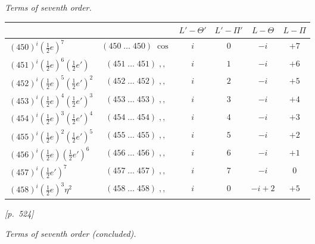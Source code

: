 \documentclass[11pt]{article}
\begin{document}
\medskip

\begin{center}
\textit{Terms of seventh order.}
\end{center}

\smallskip

\begin{center}
\begin{tabular}{|l|c|c|c|c|c|}
\hline
 & & $L'-\Theta'$ & $L'-\Pi'$ & $L-\Theta$ & $L-\Pi$ \\
\hline
$(450)^i(\tfrac{1}{2}e)^7$ & $(450\;\ldots\;450)\;\cos$ & $i$ & $0$ & $-i$ & $+7$ \\
$(451)^i(\tfrac{1}{2}e)^6(\tfrac{1}{2}e')$ & $(451\;\ldots\;451)\;,,$ & $i$ & $1$ & $-i$ & $+6$ \\
$(452)^i(\tfrac{1}{2}e)^5(\tfrac{1}{2}e')^2$ & $(452\;\ldots\;452)\;,,$ & $i$ & $2$ & $-i$ & $+5$ \\
$(453)^i(\tfrac{1}{2}e)^4(\tfrac{1}{2}e')^3$ & $(453\;\ldots\;453)\;,,$ & $i$ & $3$ & $-i$ & $+4$ \\
$(454)^i(\tfrac{1}{2}e)^3(\tfrac{1}{2}e')^4$ & $(454\;\ldots\;454)\;,,$ & $i$ & $4$ & $-i$ & $+3$ \\
$(455)^i(\tfrac{1}{2}e)^2(\tfrac{1}{2}e')^5$ & $(455\;\ldots\;455)\;,,$ & $i$ & $5$ & $-i$ & $+2$ \\
$(456)^i(\tfrac{1}{2}e)(\tfrac{1}{2}e')^6$ & $(456\;\ldots\;456)\;,,$ & $i$ & $6$ & $-i$ & $+1$ \\
$(457)^i(\tfrac{1}{2}e')^7$ & $(457\;\ldots\;457)\;,,$ & $i$ & $7$ & $-i$ & $0$ \\
$(458)^i(\tfrac{1}{2}e)^3\eta^2$ & $(458\;\ldots\;458)\;,,$ & $i$ & $0$ & $-i+2$ & $+5$ \\
\hline
\end{tabular}
\end{center}


\newpage
\noindent\textit{[p.~524]}

\medskip

\begin{center}
\textit{Terms of seventh order (concluded).}
\end{center}

\smallskip
\end{document}
